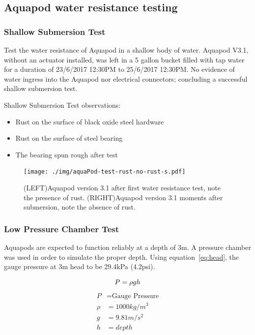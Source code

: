 
\subsection{Aquapod water resistance testing}


\subsubsection{Shallow Submersion Test}
Test the water resistance of Aquapod in a shallow body of water.
Aquapod V3.1, without an actuator installed, was left in a 5 gallon bucket filled with tap water for a duration of 23/6/2017 12:30PM to 25/6/2017 12:30PM. 
No evidence of water ingress into the Aquapod nor electrical connectors; concluding a successful shallow submersion test.

Shallow Submersion Test observations:
\begin{itemize}
    \item Rust on the surface of black oxide steel hardware
    
    \item Rust on the surface of steel bearing

    \item The bearing spun rough after test

\end{itemize}

\begin{figure}[h]
\centering
\texttt{[image: ./img/aquaPod-test-rust-no-rust-s.pdf]}
\caption{(LEFT)Aquapod version 3.1 after first water resistance test, note the presence of rust.  (RIGHT)Aquapod version 3.1 moments after submersion, note the absence of rust.}
\label{fig:pod in bucket}\label{fig:pod rust}
\end{figure}




\subsubsection{Low Pressure Chamber Test}
Aquapods are expected to function reliably at a depth of 3m. A pressure chamber was used in order to simulate the proper depth. Using equation~\ref{eq:head}, the gauge pressure at 3m head to be 29.4kPa (4.2psi).

\begin{equation}\label{eq:head}
    P = \rho g h \\
\end{equation}
\begin{align*}
    P & = \text{Gauge Pressure}  \\
    \rho & = 1000 kg/m^3 \\
    g & = 9.81 m/s^2 \\
    h & = depth  \\
\end{align*}

